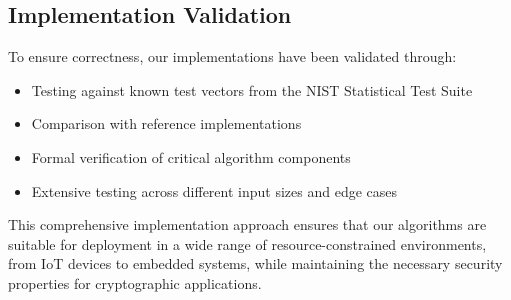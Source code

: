 \subsection{Implementation Validation}
To ensure correctness, our implementations have been validated through:
\begin{itemize}
    \item Testing against known test vectors from the NIST Statistical Test Suite \cite{nist_test_suite}
    \item Comparison with reference implementations
    \item Formal verification of critical algorithm components
    \item Extensive testing across different input sizes and edge cases
\end{itemize}

This comprehensive implementation approach ensures that our algorithms are suitable for deployment in a wide range of resource-constrained environments, from IoT devices to embedded systems, while maintaining the necessary security properties for cryptographic applications. 